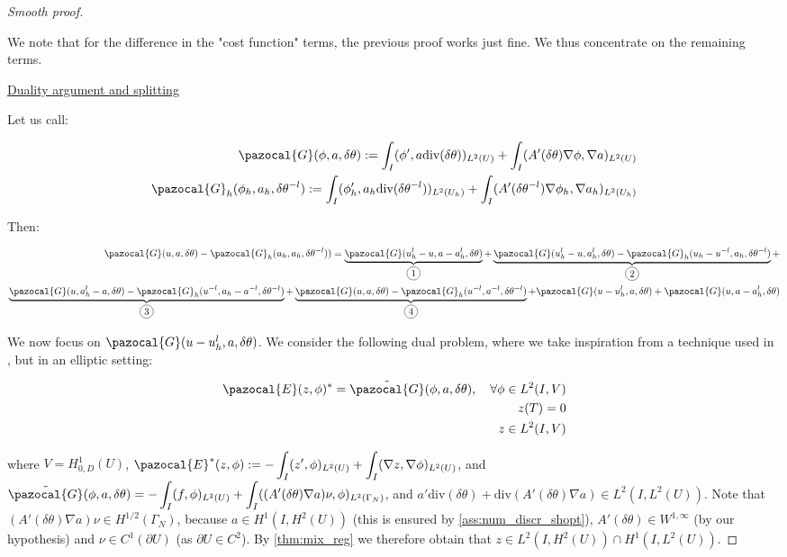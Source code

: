 \documentclass[english,a4paper,9pt,oneside]{scrbook}	%
\theoremstyle{break}
\newenvironment{mproof}[1][\proofname]{%
  \begin{proof}[#1]$ $\par\nobreak\ignorespaces
}{%
  \end{proof}
}
\renewcommand*{\proofname}{Proof}
\theoremstyle{remark}
\newcommand{\ds}{\displaystyle}
\newcommand{\te}{\theta}
\newcommand{\dive}{\text{div}}
\newcommand*\circled[1]{\tikz[baseline=(char.base)]{
            \node[shape=circle,draw,inner sep=2pt] (char) {#1};}}
\newcommand{\mE}{\pazocal{E}}
\newcommand{\mG}{\pazocal{G}}
\begin{document}
\begin{mproof}[Smooth proof]

We note that for the difference in the "cost function" terms, the previous proof works just fine. We thus concentrate on the remaining terms.

\underline{Duality argument and splitting}

Let us call: 

\begin{align*}
\mG(\phi,a, \delta \te):=\ds \int_I(\phi',a\dive(\delta \te))_{L^2(U)} + \int_I (A'(\delta\te )\nabla \phi, \nabla a)_{L^2(U)}\\
\mG_h(\phi_h,a_h, \delta \te^{-l}):=\ds \int_I (\phi_h',a_h\dive(\delta \te^{-l}))_{L^2(U_h)} + \int_I (A'(\delta \te^{-l})\nabla \phi_h, \nabla a_h)_{L^2(U_h)}
\end{align*}

Then:

\begin{align*}
	\mG(u,a, \delta \te) - \mG_h(u_h,a_h, \delta \te^{-l})) =
	\underbrace{\mG(u_h^l-u, a-a_h^l, \delta \te)}_{\circled{1}}+
	\underbrace{\mG(u_h^l-u,a_h^l, \delta \te) - \mG_h(u_h-u^{-l},a_h,\delta \te^{-l})}_{\circled{2}}+\\
	\underbrace{\mG(u,a_h^l-a,\delta \te) - \mG_h(u^{-l}, a_h - a^{-l}, \delta \te^{-l})}_{\circled{3}}+
	\underbrace{\mG(u,a,\delta \te) - \mG_h(u^{-l},a^{-l},\delta \te^{-l})}_{\circled{4}} +
	\mG(u-u_h^l, a, \delta \te)+	\mG(u, a-a_h^l,\delta \te)
\end{align*}

We now focus on $\mG(u-u_h^l, a, \delta \te)$. We consider the following dual problem, where we take inspiration from a technique used in \cite{paganini}, but in an elliptic setting:

\begin{align}
\label{eqn:dual_problem}
	\mE(z,\phi)^* = \tilde{\mG}(\phi, a, \delta \te), \quad \forall \phi \in L^2(I,V)\\
	z(T) = 0 \\
	z \in L^2(I,V)
\end{align}

where $V = H^1_{0,D}(U)$, $\mE^*(z,\phi) := -\ds \int_I(z',\phi)_{L^2(U)} + \int_I (\nabla z, \nabla \phi)_{L^2(U)}$, and $\tilde{\mG}(\phi, a, \delta \te) =  \ds -\int_I(f, \phi)_{L^2(U)} + \int_I((A'(\delta \te) \nabla a)\nu, \phi)_{L^2(\Gamma_N)}$, and $a'\dive(\delta \te) + \dive(A'(\delta \te) \nabla a )\in L^2(I,L^2(U))$.
Note that $(A'(\delta \te) \nabla a)\nu \in H^{1/2}(\Gamma_N)$, because $a \in H^1(I,H^2(U))$ (this is ensured by \cref{ass:num_discr_shopt}), $A'(\delta \te) \in W^{1,\infty}$ (by our hypothesis) and $\nu \in C^1(\partial U)$ (as $\partial U \in C^2$). By \cref{thm:mix_reg} we therefore obtain that $z \in L^2(I,H^2(U)) \cap H^1(I,L^2(U))$.


\end{mproof}
\end{document}
